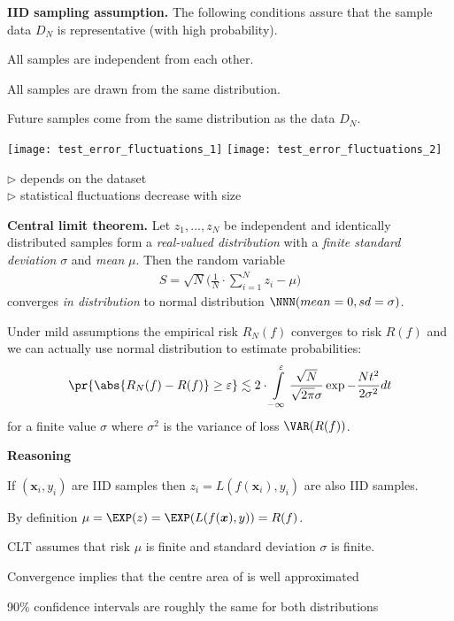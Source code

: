 \documentclass[landscape,footrule]{foils}
\renewcommand{\vec}[1]{\boldsymbol{#1}}
\begin{document}
\textbf{IID sampling assumption.} The following conditions assure that the sample data $D_N$ is representative (with high probability).
\begin{triangles}
\item All samples are independent from each other. 
\item All samples are drawn from the same distribution.
\item Future samples come from the same distribution as the data $D_N$.
\end{triangles}

\enlargethispage{1cm}
\centerline{
\texttt{[image: test\_error\_fluctuations\_1]}\hspace*{0.5cm}
\texttt{[image: test\_error\_fluctuations\_2]}}

\vspace*{-0.0cm}
$\triangleright$  depends on the dataset\\
$\triangleright$  statistical fluctuations decrease with size




\textbf{Central limit theorem.}
Let $z_1, \ldots, z_N$ be independent and identically distributed samples form a \emph{real-valued distribution} with a \emph{finite standard deviation} $\sigma$ and \emph{mean} $\mu$. Then the random variable 
\begin{align*}
S=\sqrt{N}\Biggl(\frac{1}{N}\cdot \sum_{i=1}^N z_i -\mu\Biggr)
\end{align*}
converges \emph{in distribution} to normal distribution $\NNN(mean=0, sd=\sigma)$.  



Under mild assumptions the empirical risk $R_N(f)$ converges to risk $R(f)$ and we can actually use normal distribution to estimate probabilities:
\begin{align*}
\pr{\abs{R_N(f)-R(f)}\geq \varepsilon} \lesssim 2\cdot \int\limits_{-\infty}^\varepsilon\frac{\sqrt{N}}{\sqrt{2\pi}\sigma}\exp{-\frac{N t^2}{2 \sigma^2}}dt
\end{align*}
for a finite value $\sigma$ where $\sigma^2$ is the variance of loss $\VAR(R(f))$.
\vspace*{1cm}

\textbf{Reasoning}
\begin{triangles}
\item If $(\vec{x}_i, y_i)$ are IID samples then $z_i=L(f(\vec{x}_i), y_i)$ are also IID samples.
\item By definition $\mu=\EXP(z)=\EXP(L(f(\vec{x}),y))=R(f)$.
\item CLT assumes that risk $\mu$ is finite and standard deviation $\sigma$ is finite.
\end{triangles}
\bigskip




\vspace*{-0.5cm}

Convergence implies that the centre area of is well approximated 
\begin{triangles}
\item 90\% confidence intervals are roughly the same for both distributions
\end{triangles}
\end{document}
